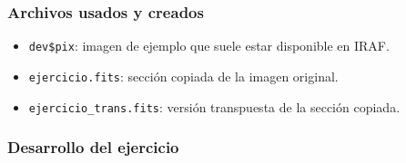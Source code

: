 \subsubsection*{Archivos usados y creados}

\begin{itemize}
    \item \texttt{dev\$pix}: imagen de ejemplo que suele estar disponible en IRAF.
    \item \texttt{ejercicio.fits}: sección copiada de la imagen original.
    \item \texttt{ejercicio\_trans.fits}: versión transpuesta de la sección copiada.
\end{itemize}

\subsubsection*{Desarrollo del ejercicio}

